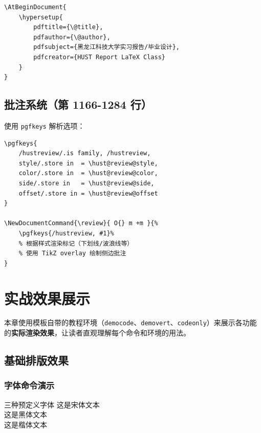 \documentclass[linux]{hustreport}
\begin{document}
\begin{verbatim}
\AtBeginDocument{
    \hypersetup{
        pdftitle={\@title},
        pdfauthor={\@author},
        pdfsubject={黑龙江科技大学实习报告/毕业设计},
        pdfcreator={HUST Report LaTeX Class}
    }
}
\end{verbatim}

\subsection{批注系统（第 1166-1284 行）}

使用 \texttt{pgfkeys} 解析选项：

\begin{verbatim}
\pgfkeys{
    /hustreview/.is family, /hustreview,
    style/.store in  = \hust@review@style,
    color/.store in  = \hust@review@color,
    side/.store in   = \hust@review@side,
    offset/.store in = \hust@review@offset
}

\NewDocumentCommand{\review}{ O{} m +m }{%
    \pgfkeys{/hustreview, #1}%
    % 根据样式渲染标记（下划线/波浪线等）
    % 使用 TikZ overlay 绘制侧边批注
}
\end{verbatim}

\newpage
\section{实战效果展示}

本章使用模板自带的教程环境（\texttt{democode}、\texttt{demovert}、\texttt{codeonly}）来展示各功能的\textbf{实际渲染效果}，让读者直观理解每个命令和环境的用法。

\subsection{基础排版效果}

\subsubsection{字体命令演示}

\begin{democode}{三种预定义字体}
{\songti 这是宋体文本} \\
{\heiti 这是黑体文本} \\
{\kaiti 这是楷体文本}
\end{democode}
\end{document}
